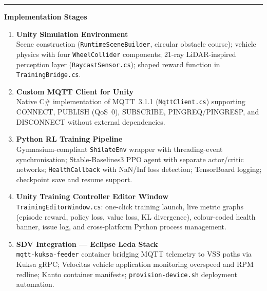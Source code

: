 \documentclass[12pt, a4paper]{article}
\begin{document}
\vspace{4pt}
\noindent\rule{\textwidth}{0.4pt}
\vspace{4pt}

\noindent\textbf{Implementation Stages}\par\smallskip

\begin{enumerate}[leftmargin=1.4cm, itemsep=3pt]
  \item \textbf{Unity Simulation Environment}\\
        Scene construction (\texttt{RuntimeSceneBuilder}, circular obstacle
        course); vehicle physics with four \texttt{WheelCollider} components;
        21-ray LiDAR-inspired perception layer (\texttt{RaycastSensor.cs});
        shaped reward function in \texttt{TrainingBridge.cs}.

  \item \textbf{Custom MQTT Client for Unity}\\
        Native C\# implementation of MQTT~3.1.1 (\texttt{MqttClient.cs})
        supporting CONNECT, PUBLISH (QoS~0), SUBSCRIBE, PINGREQ/PINGRESP,
        and DISCONNECT without external dependencies.

  \item \textbf{Python RL Training Pipeline}\\
        Gymnasium-compliant \texttt{ShilateEnv} wrapper with threading-event
        synchronisation; Stable-Baselines3 PPO agent with separate actor/critic
        networks; \texttt{HealthCallback} with NaN/Inf loss detection;
        TensorBoard logging; checkpoint save and resume support.

  \item \textbf{Unity Training Controller Editor Window}\\
        \texttt{TrainingEditorWindow.cs}: one-click training launch, live
        metric graphs (episode reward, policy loss, value loss, KL divergence),
        colour-coded health banner, issue log, and cross-platform Python process
        management.

  \item \textbf{SDV Integration --- Eclipse Leda Stack}\\
        \texttt{mqtt-kuksa-feeder} container bridging MQTT telemetry to VSS
        paths via Kuksa gRPC; Velocitas vehicle application monitoring overspeed
        and RPM redline; Kanto container manifests; \texttt{provision-device.sh}
        deployment automation.


\end{enumerate}
\end{document}
